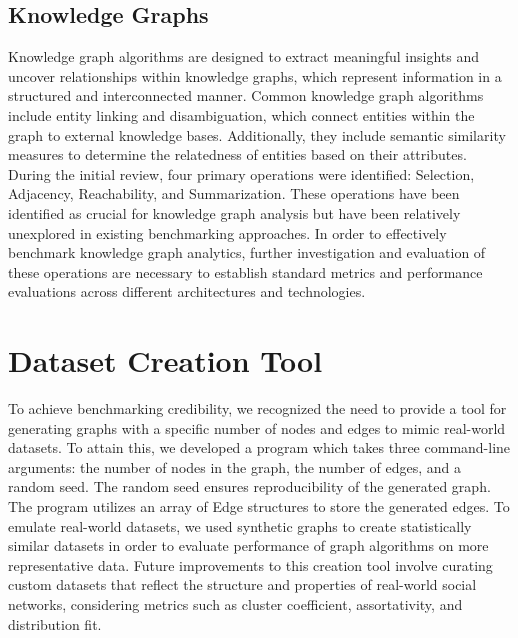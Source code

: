 \documentclass[letterpaper, 10pt]{article}
\begin{document}
\begin{multicols}{2}
        \subsection{Knowledge Graphs}
            Knowledge graph algorithms are designed to extract meaningful insights and uncover relationships within knowledge graphs, which represent information in a structured and interconnected manner. Common knowledge graph algorithms include entity linking and disambiguation, which connect entities within the graph to external knowledge bases. Additionally, they include semantic similarity measures to determine the relatedness of entities based on their attributes. During the initial review, four primary operations were identified: Selection, Adjacency, Reachability, and Summarization. These operations have been identified as crucial for knowledge graph analysis but have been relatively unexplored in existing benchmarking approaches. In order to effectively benchmark knowledge graph analytics, further investigation and evaluation of these operations are necessary to establish standard metrics and performance evaluations across different architectures and technologies.
    \section{Dataset Creation Tool}
        To achieve benchmarking credibility, we recognized the need to provide a tool for generating graphs with a specific number of nodes and edges to mimic real-world datasets. To attain this, we developed a program which takes three command-line arguments: the number of nodes in the graph, the number of edges, and a random seed. The random seed ensures reproducibility of the generated graph. The program utilizes an array of Edge structures to store the generated edges. To emulate real-world datasets, we used synthetic graphs to create statistically similar datasets in order to evaluate performance of graph algorithms on more representative data. Future improvements to this creation tool involve curating custom datasets that reflect the structure and properties of real-world social networks, considering metrics such as cluster coefficient, assortativity, and distribution fit. 

\end{multicols}
\end{document}
